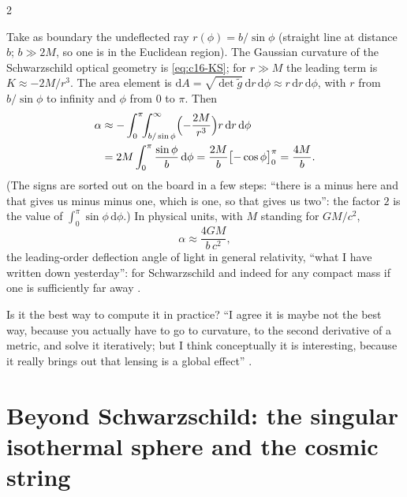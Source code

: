 \begin{paracol}{2}
\begin{example}\label{ex:c17-leading}
Take as boundary the undeflected ray $r(\phi)=b/\sin\phi$ (straight line at distance $b$; $b\gg2M$, so one is in the Euclidean region). The Gaussian curvature of the Schwarzschild optical geometry is \eqref{eq:c16-KS}; for $r\gg M$ the leading term is $K\approx-2M/r^3$. The area element is $\mathrm dA=\sqrt{\det\tilde g}\,\mathrm dr\,\mathrm d\phi\approx r\,\mathrm dr\,\mathrm d\phi$, with $r$ from $b/\sin\phi$ to infinity and $\phi$ from $0$ to $\pi$. Then
\[\begin{aligned}
  \alpha&\approx-\int_0^\pi\!\!\int_{b/\sin\phi}^\infty\Bigl(-\frac{2M}{r^3}\Bigr)r\,\mathrm dr\,\mathrm d\phi\\
  &=2M\int_0^\pi\frac{\sin\phi}{b}\,\mathrm d\phi=\frac{2M}{b}\bigl[-\cos\phi\bigr]_0^\pi=\frac{4M}{b}.
\end{aligned}\]
(The signs are sorted out on the board in a few steps: ``there is a minus here and that gives us minus minus one, which is one, so that gives us two'': the factor $2$ is the value of $\int_0^\pi\sin\phi\,\mathrm d\phi$.) In physical units, with $M$ standing for $GM/c^2$,
\[
  \alpha\approx\frac{4GM}{b\,c^2},
\]
the leading-order deflection angle of light in general relativity, ``what I have written down yesterday'': for Schwarzschild and indeed for any compact mass if one is sufficiently far away .
\end{example}
Is it the best way to compute it in practice? ``I agree it is maybe not the best way, because you actually have to go to curvature, to the second derivative of a metric, and solve it iteratively; but I think conceptually it is interesting, because it really brings out that lensing is a global effect'' .

\section{Beyond Schwarzschild: the singular isothermal sphere and the cosmic string}\label{sec:c17-sis}


\end{paracol}
